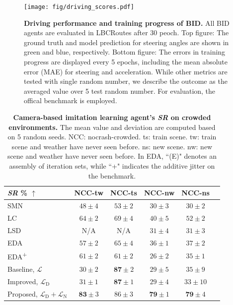 \begin{figure}[t]
	\centering
	\texttt{[image: fig/driving\_scores.pdf]}
	\vspace{-1ex}
	\caption{\textbf{Driving performance and training progress of BID.} 
		All BID agents are evaluated in LBCRoutes after 30 peoch.
		Top figure: The ground truth and model prediction for steering angles are shown in green and blue, respectively.
		Bottom figure: The errors in training progress are displayed every 5 epochs, including the mean absolute error (MAE) for steering and acceleration.
		While other metrics are tested with single random number, we describe the outcome as the averaged value over 5 test random number.
		For evaluation, the offical benchmark is employed.}
	\vspace{-1.5ex}
	\label{fig:score_eu_lb_tt_tn}
\end{figure}


\begin{table}
	\caption{\textbf{Camera-based imitation learning agent's \emph{SR} on crowded environments.}
		The mean value and deviation are computed based on 5 random seeds. 
		NCC: nocrash-crowded. ts: train scene. tw: train scene and weather have never seen before. ns: new scene. nw: new scene and weather have never seen before.
		In EDA, ``(E)" denotes an assembly of iteration sets, while ``+" indicates the additive jitter on the benchmark.}
	\setlength{\tabcolsep}{6.67pt}
	\centering
	\begin{tabular}{lccccc}
		\hline
		\emph{SR} \% $\uparrow$
		& NCC-tw  & NCC-ts   & NCC-nw  & NCC-ns  \\ 
		\hline
		SMN \cite{zhao2021sam} & 
		$48 \pm 4$ & $53 \pm 2$  & $30 \pm 3$ & $30 \pm 2$  \\
		LC \cite{chen2020learning} & 
		$64 \pm 2$ & $69 \pm 4$  & $40 \pm 5$ & $52 \pm 2$  \\
		LSD \cite{ohn2020learning} & 
		N/A & N/A & $31 \pm 4$ & $31 \pm 3$  \\
		EDA \cite{prakash2020exploring} & 
		$57 \pm 2$ & $65 \pm 4$  & $36 \pm 1$ & $37 \pm 2$  \\
		EDA\textsuperscript{+} \cite{prakash2020exploring}  & 
		$61 \pm 2$ & $61 \pm 2$  & $26 \pm 2$ & $35 \pm 1$  \\
		Baseline, $\mathcal{L}$ & 
		$30 \pm 2$ & $\mathbf{87} \pm 2$  & $29 \pm 5$ & $35 \pm 9$  \\
		Improved, $\mathcal{L}_\text{D} $ & 
		$31 \pm 1$ & $\mathbf{87} \pm 1$  & $29 \pm 4$ & $33 \pm 10$  \\
		Proposed, $\mathcal{L}_\text{D}+\mathcal{L}_\text{N}$ & 
		$\mathbf{83} \pm 3$ & $86 \pm 3$  & $\mathbf{79} \pm 1$ & $\mathbf{79} \pm 4$  \\
		\hline
	\end{tabular}
	\vspace{-1ex}
	\label{table:sucess_rate_nc_dense}
	\vspace{-2ex}
\end{table}


